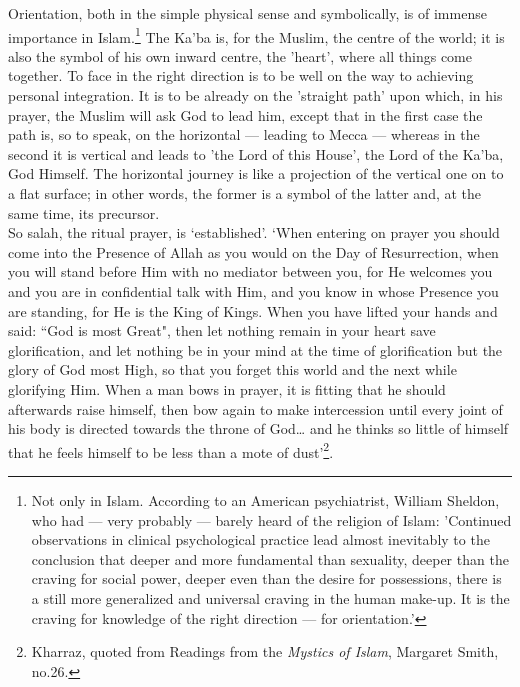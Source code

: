 \documentclass[10pt, twoside]{book}
\begin{document}
Orientation, both in the simple physical sense and symbolically, is of immense importance in Islam.\footnote{Not only in Islam. According to an American psychiatrist, William Sheldon, who had --- very probably --- barely heard of the religion of Islam: 'Continued observations in clinical psychological practice 
lead almost inevitably to the conclusion that deeper and more fundamental than sexuality, deeper than 
the craving for social power, deeper even than the desire for possessions, there is a still more 
generalized and universal craving in the human make\hyp{}up. It is the craving for knowledge of the right 
direction --- for orientation.'} The Ka'ba is, for the Muslim, the centre of the world; it is also the symbol of his own inward 
centre, the 'heart', where all things come together. To face in the right direction is to be well on 
the way to achieving personal integration. It is to be already on the 'straight path' upon which, in 
his prayer, the Muslim will ask God to lead him, except that in the first case the path is, so to 
speak, on the horizontal --- leading to Mecca --- whereas in the second it is vertical and leads to 'the 
Lord of this House', the Lord of the Ka'ba, God Himself. The horizontal journey is like a projection 
of the vertical one on to a flat surface; in other words, the former is a symbol of the latter and, 
at the same time, its precursor. \\

So salah, the ritual prayer, is `established'. `When entering on prayer you should come into the 
Presence of Allah as you would on the Day of Resurrection, when you will stand before Him with no 
mediator between you, for He welcomes you and you are in confidential talk with Him, and you know in 
whose Presence you are standing, for He is the King of Kings. When you have lifted your hands and 
said: ``God is most Great", then let nothing remain in your heart save glorification, and let nothing 
be in your mind at the time of glorification but the glory of God most High, so that you forget this 
world and the next while glorifying Him. When a man bows in prayer, it is fitting that he should 
afterwards raise himself, then bow again to make intercession until every joint of his body is 
directed towards the throne of God\ldots{} and he thinks so little of himself that he feels himself to be 
less than a mote of dust'\footnote{Kharraz, quoted from Readings from the \emph{Mystics of Islam}, Margaret Smith, no.26.}.\\
\end{document}
